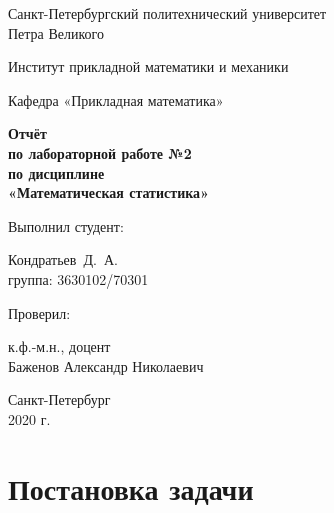 \documentclass[12pt,a4paper]{article}
\begin{document}
	\begin{titlepage}
		\begin{center}			
			Санкт-Петербургский политехнический университет\\
			Петра Великого
			\vspace{0.25cm}
			
			Институт прикладной математики и механики
			
			Кафедра «Прикладная математика»
			\vfill
			
			\textbf{Отчёт\\
				по лабораторной работе №2\\
				по дисциплине\\
				«Математическая статистика»}\\[5mm]
			\bigskip
		\end{center}
		\vfill
		
		\hfill\begin{minipage}{0.45\textwidth}
			Выполнил студент:
			\vspace{0.2cm}
			
			Кондратьев~Д.~А.\\
			группа: 3630102/70301
		\end{minipage}%
		\bigskip
		
		\hfill\begin{minipage}{0.45\textwidth}
			Проверил:
			\vspace{0.2cm}
			
			к.ф.-м.н., доцент\\
			Баженов Александр Николаевич
		\end{minipage}%
		\vfill
		
		\begin{center}
			Санкт-Петербург\\
			2020 г.
		\end{center}
	\end{titlepage}
	
	
	\tableofcontents{}
	\listoftables
	\newpage
	
	\section{Постановка задачи}
	
\end{document}
